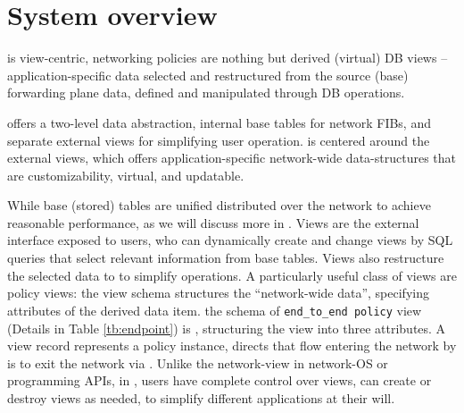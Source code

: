 \section{System overview}
\label{sec:design}

\Sys is view-centric, networking policies are nothing but derived
(virtual) DB views -- application-specific data selected and
restructured from the source (base) forwarding plane data, defined and
manipulated through DB operations.



\TI offers a two-level data abstraction, internal base tables for
network FIBs, and separate external views for simplifying user
operation.  \TI is centered around the external views, which offers
application-specific network-wide data-structures that are
customizability, virtual, and updatable.

 While base (stored) tables are
unified distributed over the network to achieve reasonable
performance, as we will discuss more in \TR. Views are the external
interface exposed to users, who can dynamically create and change
views by SQL queries that select relevant information from base
tables. Views also restructure the selected data to to simplify
operations.  
A particularly useful class of views are policy views: the view schema
structures the ``network-wide data'', specifying attributes of the
derived data item. \Eg the schema of \texttt{end\_to\_end policy} view
(Details in Table \ref{tb:endpoint}) is , structuring the view into three attributes. A view record
represents a policy instance, \eg {} directs that flow
 entering the network by  is to exit the network via
. Unlike the network-view in network-OS or programming APIs, in
\Sys, users have complete control over views, can create or destroy
views as needed, to simplify different applications at their will.


